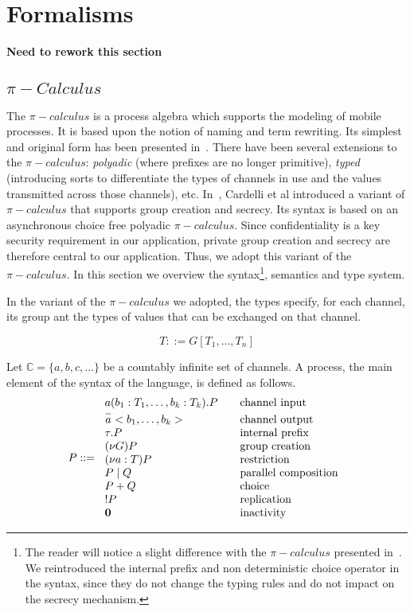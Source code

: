 \section{Formalisms} %
\label{sec:formalisms}

\textbf{Need to rework this section}

\subsection{$\pi-Calculus$} %
\label{sub:_pi_calculus_}

The $\pi-calculus$ is a process algebra which supports the modeling of mobile processes. It is based upon the notion of
naming and term rewriting. Its simplest and original form has been presented in~\cite{Milner-Parrow-Walker:89}. There
have been several extensions to the $\pi-calculus$: \emph{polyadic} (where prefixes are no longer primitive),
\emph{typed} (introducing sorts to differentiate the types of channels in use and the values transmitted across those
channels), etc. In~\cite{Cardelli-Ghelli-Gordon:05}, Cardelli et al introduced a variant of $\pi-calculus$ that supports
group creation and secrecy. Its syntax is based on an asynchronous choice free polyadic $\pi-calculus$. Since
confidentiality is a key security requirement in our application, private group creation and secrecy are therefore
central to our application. Thus, we adopt this variant of the $\pi-calculus$. In this section we overview the
syntax\footnote{The reader will notice a slight difference with the $\pi-calculus$ presented
in~\cite{Cardelli-Ghelli-Gordon:05}. We reintroduced the internal prefix and non deterministic choice operator in the
syntax, since they do not change the typing rules and do not impact on the secrecy mechanism.}, semantics and type
system.

In the variant of the $\pi-calculus$ we adopted, the types specify, for each channel, its group ant the types of values
that can be exchanged on that channel.

\begin{displaymath}
	T::=G[T_1,\ldots, T_n]
\end{displaymath}

Let $\mathbb{C}=\{a,b,c,\ldots\}$ be a countably infinite set of channels. A process, the main element of the syntax of the language, is defined as follows. 
\[
P::= \left. \begin{array}{l l}
a(b_1:T_1,\ldots,b_k:T_k).P & \quad \mbox{channel input}\\
\overset{-}{a}<b_1,\ldots,b_k> & \quad \mbox{channel output}\\
\tau.P & \quad \mbox{internal prefix}\\
(\nu G)P & \quad \mbox{group creation}\\
(\nu a:T)P & \quad \mbox{restriction}\\
P\mid Q & \quad \mbox{parallel composition}\\
P + Q & \quad \mbox{choice}\\
!P & \quad \mbox{replication}\\
\mathbf{0} & \quad \mbox{inactivity}\\
\end{array} \right.
\]

